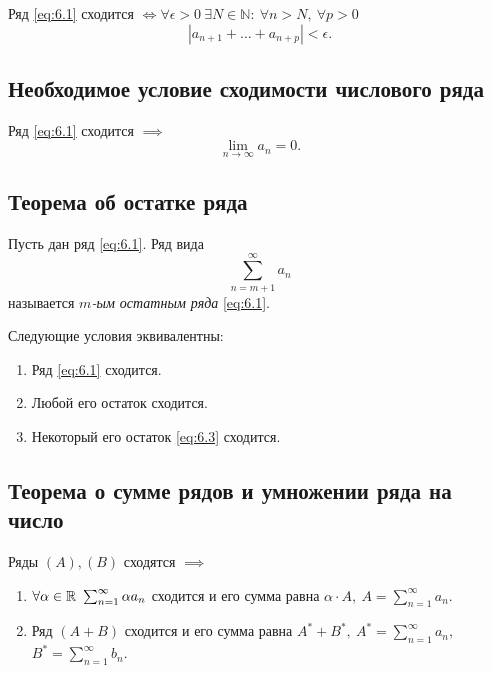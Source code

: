 \begin{theorem}
    Ряд \ref{eq:6.1} сходится $\iff \forall \epsilon > 0 \ \exists N \in \mathbb{N}: \ \forall n > N, \ \forall p > 0$
    \[
        |a_{n+1} + \ldots + a_{n+p}| < \epsilon.
    \]
\end{theorem}

\subsection{Необходимое условие сходимости числового ряда}

\begin{theorem}
    Ряд \ref{eq:6.1} сходится $ \implies $
    \[
        \underset{n\rightarrow\infty}{\lim}a_n = 0.
    \]
\end{theorem}

\subsection{Теорема об остатке ряда}

\begin{definition}
    Пусть дан ряд \ref{eq:6.1}. Ряд вида
    \begin{equation}\label{eq:6.3}
        \sum_{n=m+1}^{\infty}a_n
    \end{equation}
    называется \emph{$ m $-ым остатным ряда} \ref{eq:6.1}.
\end{definition}

\begin{theorem}
    Следующие условия эквивалентны:
    \begin{enumerate}
        \item Ряд \ref{eq:6.1} сходится.
        \item Любой его остаток сходится.
        \item Некоторый его остаток \ref{eq:6.3} сходится.
    \end{enumerate}
\end{theorem}

\newpage

\subsection{Теорема о сумме рядов и умножении ряда на число}

\begin{theorem}
    Ряды $ (A),(B) $ сходятся $ \implies $
    \begin{enumerate}
        \item $ \forall \alpha \in \R \ \sum_{n=1}^{\infty}\alpha a_n $ сходится и его сумма равна $ \alpha \cdot A, \ A = \sum_{n=1}^{\infty}a_n $.

        \item Ряд $ (A+B) $ сходится и его сумма равна $ A^* + B^*, \ A^* = \sum_{n=1}^{\infty}a_n,$ $ B^* = \sum_{n=1}^{\infty}b_n $.
    \end{enumerate}
\end{theorem}

